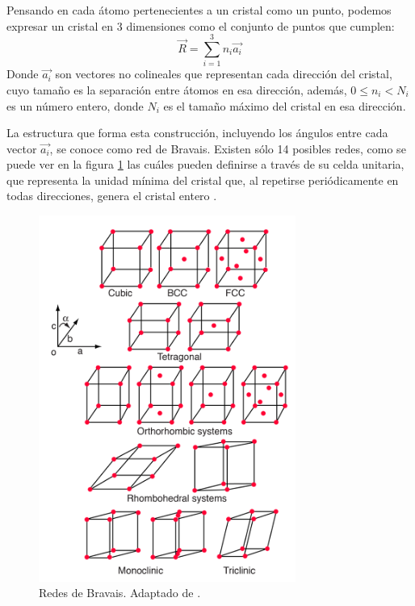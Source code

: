\documentclass[../main.tex]{subfiles}
\begin{document}
Pensando en cada átomo pertenecientes a un cristal como un punto, podemos expresar un cristal en 3 dimensiones como el conjunto de puntos que cumplen:
\begin{equation}
    \vec{R}=\sum_{i=1}^{3} n_i\vec{a_i}  
    \label{eq:estrcrist}
\end{equation}
Donde $\vec{a_i}$ son vectores no colineales que representan cada dirección del cristal, cuyo tamaño es la separación entre átomos en esa dirección, además, $0\leq n_i<N_i$ es un número entero, donde $N_i$ es el tamaño máximo del cristal en esa dirección.

La estructura que forma esta construcción, incluyendo los ángulos entre cada vector $\vec{a_i}$, se conoce como red de Bravais. Existen sólo 14 posibles redes, como se puede ver en la figura \ref{fig:bravais} las cuáles pueden definirse a través de su celda unitaria, que representa la unidad mínima del cristal que, al repetirse periódicamente en todas direcciones, genera el cristal entero \cite{Ashcroft1976}.
\begin{figure}[H]
    \centering
    \includegraphics[width=0.75\textwidth]{fig/bravais.png}
    \caption{Redes de Bravais. Adaptado de \cite{ScienceFacts2024}.}
    \label{fig:bravais}
\end{figure}
\end{document}
